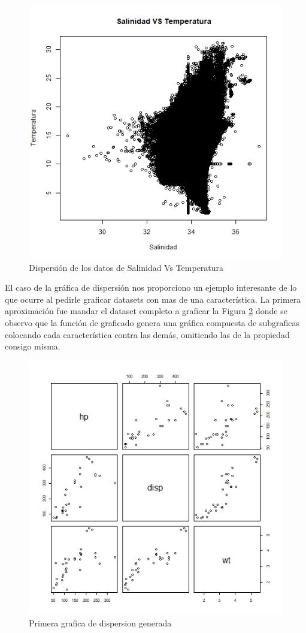 \documentclass[sigconf]{acmart}
\begin{document}
	\begin{figure}
		\centering
		\includegraphics[width=0.7\linewidth]{img/dispersionSalinidadVSTemperatura.png}
		\caption{Dispersión de los datos de Salinidad Vs Temperatura}
		\label{fig:waterD}
	\end{figure}
	
	El caso de la gráfica de dispersión nos proporciono un ejemplo interesante de lo que ocurre al pedirle graficar datasets con mas de una característica. La primera aproximación fue mandar el dataset completo a graficar la Figura \ref{fig:carsD1} donde se observo que la función de graficado genera una gráfica compuesta de subgraficas colocando cada característica contra las demás, omitiendo las de la propiedad consigo misma.
	
	\begin{figure}
		\centering
		\includegraphics[width=0.7\linewidth]{img/dispersionCarros.png}
		\caption{Primera grafica de dispersion generada}
		\label{fig:carsD1}
	\end{figure}
	
\end{document}
